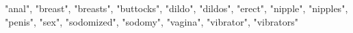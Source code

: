 "anal", "breast", "breasts", "buttocks", "dildo", "dildos", "erect",
"nipple", "nipples", "penis", "sex", "sodomized", "sodomy", "vagina",
"vibrator", "vibrators"
